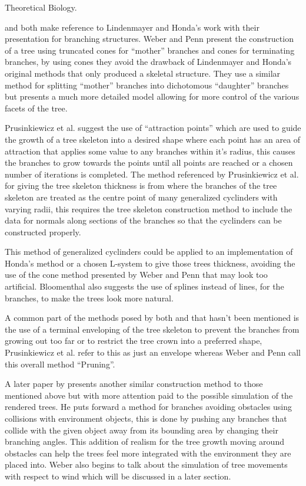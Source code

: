 \documentclass[review]{cmpreport}
\begin{document}
Theoretical Biology. \par
\cite{weber1995rendering} and \cite{runions2007colonization} both make reference to 
Lindenmayer and Honda's work with their presentation for branching structures. 
Weber and Penn present the construction of a tree using truncated cones for ``mother'' 
branches and cones for terminating branches, by using cones they avoid the drawback 
of Lindenmayer and Honda's original methods that only produced a skeletal structure. 
They use a similar method for splitting ``mother'' branches into dichotomous 
``daughter'' branches but presents a much more detailed model allowing for more 
control of the various facets of the tree. \par
Prusinkiewicz et al. suggest the use of ``attraction points'' which are used to 
guide the growth of a tree skeleton into a desired shape where each point has an 
area of attraction that applies some value to any branches within it's radius, this 
causes the branches to grow towards the points until all points are reached or a 
chosen number of iterations is completed. The method referenced by Prusinkiewicz 
et al. for giving the tree skeleton thickness is from \cite{bloomenthal1985modeling} 
where the branches of the tree skeleton are treated as the centre point of many 
generalized cyclinders with varying radii, this requires the tree skeleton construction 
method to include the data for normals along sections of the branches so that the 
cyclinders can be constructed properly. \par
This method of generalized cyclinders could be applied to an implementation of Honda's 
method or a chosen L-system to give those trees thickness, avoiding the use of the 
cone method presented by Weber and Penn that may look too artificial. Bloomenthal 
also suggests the use of splines instead of lines, for the branches, to make the trees 
look more natural. \par
A common part of the methods posed by both \cite{weber1995rendering} and 
\cite{runions2007colonization} that hasn't been mentioned is the use of a terminal 
enveloping of the tree skeleton to prevent the branches from growing out too far or to 
restrict the tree crown into a preferred shape, Prusinkiewicz et al. refer to this as 
just an envelope whereas Weber and Penn call this overall method ``Pruning''. \par
A later paper by \cite{weber2008simulation} presents another similar construction method 
to those mentioned above but with more attention paid to the possible simulation of the 
rendered trees. He puts forward a method for branches avoiding obstacles using collisions 
with environment objects, this is done by pushing any branches that collide with the given 
object away from its bounding area by changing their branching angles. This addition 
of realism for the tree growth moving around obstacles can help the trees feel more 
integrated with the environment they are placed into. Weber also begins to talk about 
the simulation of tree movements with respect to wind which will be discussed in a 
later section.
\end{document}
